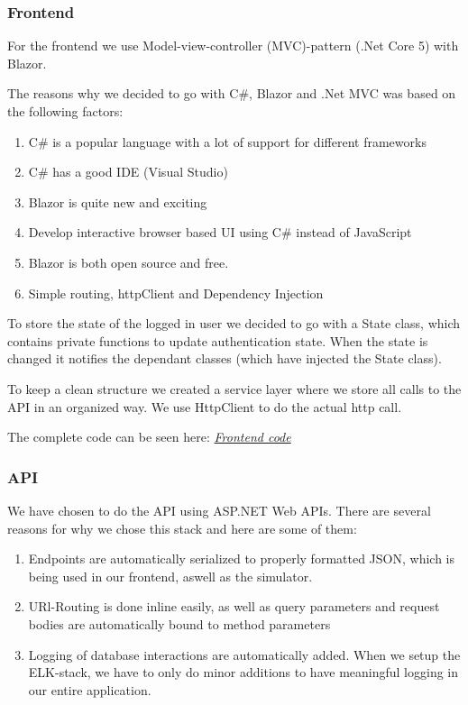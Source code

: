 \documentclass[10pt]{article}
\begin{document}
\subsubsection{Frontend}
\label{frontenddisc}

For the frontend we use Model-view-controller (MVC)-pattern (.Net Core 5) with Blazor. 

The reasons why we decided to go with C\#, Blazor and .Net MVC was based on the following factors:
\begin{enumerate}
\item C\# is a popular language with a lot of support for different frameworks
\item C\# has a good IDE (Visual Studio)
\item Blazor is quite new and exciting
\item Develop interactive browser based UI using C\# instead of JavaScript
\item Blazor is both open source and free.
\item Simple routing, httpClient and Dependency Injection
\end{enumerate}

To store the state of the logged in user we decided to go with a State class, which contains private functions to update authentication state. When the state is changed it notifies the dependant classes (which have injected the State class). 

To keep a clean structure we created a service layer where we store all calls to the API in an organized way. We use HttpClient to do the actual http call. 

The complete code can be seen here: \href{https://github.com/Arklaide/devopsITUproject/tree/main/MinitwitFrontend/MinitwitFrontend}{\textit{Frontend code}}

\subsubsection{API}
\label{apidisc}
We have chosen to do the API using ASP.NET Web APIs. There are several reasons for why we chose this stack and here are some of them:
\begin{enumerate}
    \item Endpoints are automatically serialized to properly formatted JSON, which is being used in our frontend, aswell as the simulator.
    \item URl-Routing is done inline easily, as well as query parameters and request bodies are automatically bound to method parameters
    \item Logging of database interactions are automatically added. When we setup the ELK-stack, we have to only do minor additions to have meaningful logging in our entire application.
\end{enumerate}
\end{document}
